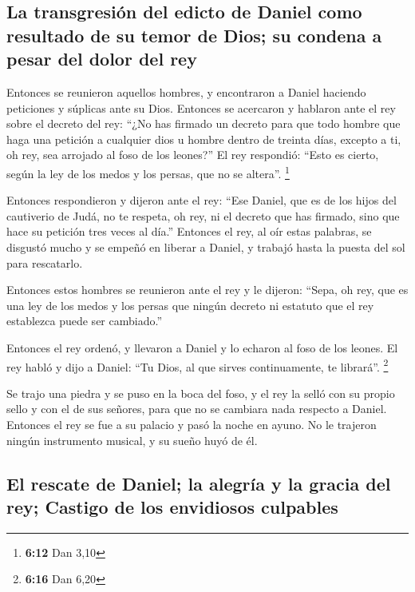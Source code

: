 \begin{paracol}{2}
\hypertarget{la-transgresiuxf3n-del-edicto-de-daniel-como-resultado-de-su-temor-de-dios-su-condena-a-pesar-del-dolor-del-rey}{%
\subsection{La transgresión del edicto de Daniel como resultado de su
temor de Dios; su condena a pesar del dolor del
rey}\label{la-transgresiuxf3n-del-edicto-de-daniel-como-resultado-de-su-temor-de-dios-su-condena-a-pesar-del-dolor-del-rey}}

 Entonces se reunieron aquellos hombres, y encontraron a
Daniel haciendo peticiones y súplicas ante su Dios. 
Entonces se acercaron y hablaron ante el rey sobre el decreto del rey:
``¿No has firmado un decreto para que todo hombre que haga una petición
a cualquier dios u hombre dentro de treinta días, excepto a ti, oh rey,
sea arrojado al foso de los leones?'' El rey respondió: ``Esto es
cierto, según la ley de los medos y los persas, que no se altera''.
\footnote{\textbf{6:12} Dan 3,10}

 Entonces respondieron y dijeron ante el rey: ``Ese
Daniel, que es de los hijos del cautiverio de Judá, no te respeta, oh
rey, ni el decreto que has firmado, sino que hace su petición tres veces
al día.''  Entonces el rey, al oír estas palabras, se
disgustó mucho y se empeñó en liberar a Daniel, y trabajó hasta la
puesta del sol para rescatarlo.

 Entonces estos hombres se reunieron ante el rey y le
dijeron: ``Sepa, oh rey, que es una ley de los medos y los persas que
ningún decreto ni estatuto que el rey establezca puede ser cambiado.''

 Entonces el rey ordenó, y llevaron a Daniel y lo echaron
al foso de los leones. El rey habló y dijo a Daniel: ``Tu Dios, al que
sirves continuamente, te librará''. \footnote{\textbf{6:16} Dan 6,20}

 Se trajo una piedra y se puso en la boca del foso, y el
rey la selló con su propio sello y con el de sus señores, para que no se
cambiara nada respecto a Daniel.  Entonces el rey se fue
a su palacio y pasó la noche en ayuno. No le trajeron ningún instrumento
musical, y su sueño huyó de él.

\hypertarget{el-rescate-de-daniel-la-alegruxeda-y-la-gracia-del-rey-castigo-de-los-envidiosos-culpables}{%
\subsection{El rescate de Daniel; la alegría y la gracia del rey;
Castigo de los envidiosos
culpables}\label{el-rescate-de-daniel-la-alegruxeda-y-la-gracia-del-rey-castigo-de-los-envidiosos-culpables}}


\end{paracol}
